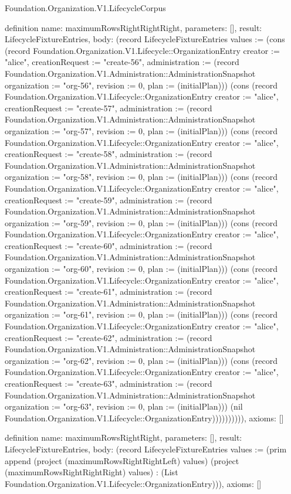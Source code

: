 \begin{lexlean}{Foundation.Organization.V1.LifecycleCorpus}
\begin{semanticmodule}
definition{
  name: maximumRowsRightRightRight,
  parameters: [],
  result: LifecycleFixtureEntries,
  body: (record LifecycleFixtureEntries {values := (cons (record Foundation.Organization.V1.Lifecycle::OrganizationEntry {creator := "alice", creationRequest := "create-56", administration := (record Foundation.Organization.V1.Administration::AdministrationSnapshot {organization := "org-56", revision := 0, plan := (initialPlan)})}) (cons (record Foundation.Organization.V1.Lifecycle::OrganizationEntry {creator := "alice", creationRequest := "create-57", administration := (record Foundation.Organization.V1.Administration::AdministrationSnapshot {organization := "org-57", revision := 0, plan := (initialPlan)})}) (cons (record Foundation.Organization.V1.Lifecycle::OrganizationEntry {creator := "alice", creationRequest := "create-58", administration := (record Foundation.Organization.V1.Administration::AdministrationSnapshot {organization := "org-58", revision := 0, plan := (initialPlan)})}) (cons (record Foundation.Organization.V1.Lifecycle::OrganizationEntry {creator := "alice", creationRequest := "create-59", administration := (record Foundation.Organization.V1.Administration::AdministrationSnapshot {organization := "org-59", revision := 0, plan := (initialPlan)})}) (cons (record Foundation.Organization.V1.Lifecycle::OrganizationEntry {creator := "alice", creationRequest := "create-60", administration := (record Foundation.Organization.V1.Administration::AdministrationSnapshot {organization := "org-60", revision := 0, plan := (initialPlan)})}) (cons (record Foundation.Organization.V1.Lifecycle::OrganizationEntry {creator := "alice", creationRequest := "create-61", administration := (record Foundation.Organization.V1.Administration::AdministrationSnapshot {organization := "org-61", revision := 0, plan := (initialPlan)})}) (cons (record Foundation.Organization.V1.Lifecycle::OrganizationEntry {creator := "alice", creationRequest := "create-62", administration := (record Foundation.Organization.V1.Administration::AdministrationSnapshot {organization := "org-62", revision := 0, plan := (initialPlan)})}) (cons (record Foundation.Organization.V1.Lifecycle::OrganizationEntry {creator := "alice", creationRequest := "create-63", administration := (record Foundation.Organization.V1.Administration::AdministrationSnapshot {organization := "org-63", revision := 0, plan := (initialPlan)})}) (nil Foundation.Organization.V1.Lifecycle::OrganizationEntry)))))))))}),
  axioms: []
}

definition{
  name: maximumRowsRightRight,
  parameters: [],
  result: LifecycleFixtureEntries,
  body: (record LifecycleFixtureEntries {values := (prim append (project (maximumRowsRightRightLeft) values) (project (maximumRowsRightRightRight) values) : (List Foundation.Organization.V1.Lifecycle::OrganizationEntry))}),
  axioms: []
}


\end{semanticmodule}
\end{lexlean}
